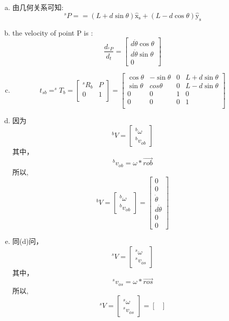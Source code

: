 \begin{enumerate}[(a)]
    \item 
    由几何关系可知:\[^sP==(L+d \sin \theta) \hat{\mathrm{x}}_{\mathrm{s}}+(L-d \cos \theta) \hat{\mathrm{y}}_{\mathrm{s}} \]
    \item 
    the velocity of point P is : \[\frac{d_{^sP}}{d_t} = \begin{bmatrix}
        d\dot{\theta}\cos\theta\\ d\dot{\theta}\sin\theta \\ 0
    \end{bmatrix}\]
    \item 
    \[t_{sb} = ^sT_b = \begin{bmatrix}
        ^sR_b & P \\
        0 & 1\\
    \end{bmatrix} =
    \begin{bmatrix}
        \cos\theta & -\sin\theta & 0 & L+d\sin\theta \\
        \sin\theta & cos\theta & 0 & L-d\sin\theta \\
        0 & 0 & 1 & 0 \\
        0 & 0 & 0 & 1\\
    \end{bmatrix}\]
    \item 
    因为
    \[^bV = \begin{bmatrix}
        ^b\omega\\^bv_{ob}
    \end{bmatrix} \]
    其中，\[^bv_{ob} = \omega * \overrightarrow{rob}\]
    所以,\[^bV = \begin{bmatrix}^b\omega\\^bv_{ob}\end{bmatrix} = \begin{bmatrix}
    0 \\ 0 \\ \dot{\theta} \\ d\dot{\theta} \\ 0 \\ 0
    \end{bmatrix}\]
    \item 
    同(d)问，\[^sV = \begin{bmatrix}
    ^s\omega\\^sv_{os}
    \end{bmatrix} \]
    其中，\[^sv_{os} = \omega * \overrightarrow{ros}\]
    所以,\[^sV = \begin{bmatrix}^s\omega\\^sv_{os}\end{bmatrix} = \begin{bmatrix}

\end{bmatrix}\]
\end{enumerate}
